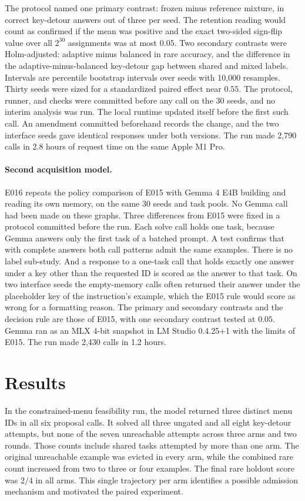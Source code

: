 \documentclass[11pt]{article}
\begin{document}
The protocol named one primary contrast: frozen minus reference
mixture, in correct key-detour answers out of three per seed. The
retention reading would count as confirmed if the mean was positive and
the exact two-sided sign-flip value over all $2^{30}$ assignments was
at most $0.05$. Two secondary contrasts were Holm-adjusted: adaptive
minus balanced in rare accuracy, and the difference in the
adaptive-minus-balanced key-detour gap between shared and mixed labels.
Intervals are percentile bootstrap intervals over seeds with 10,000
resamples. Thirty seeds were sized for a standardized paired effect
near $0.55$.
The protocol, runner, and checks were committed before any call on the
30 seeds, and no interim analysis was run. The local runtime updated
itself before the first such call. An amendment committed beforehand
records the change, and the two interface seeds gave identical
responses under both versions. The run made 2,790 calls in 2.8 hours
of request time on the same Apple M1 Pro.

\paragraph{Second acquisition model.}
E016 repeats the policy comparison of E015 with Gemma 4 E4B building
and reading its own memory, on the same 30 seeds and task pools. No
Gemma call had been made on these graphs. Three differences from E015
were fixed in a protocol committed before the run. Each solve call
holds one task, because Gemma answers only the first task of a batched
prompt. A test confirms that with complete answers both call patterns
admit the same examples. There is no label sub-study. And a response
to a one-task call that holds exactly one answer under a key other than
the requested ID is scored as the answer to that task. On two
interface seeds the empty-memory calls often returned their answer
under the placeholder key of the instruction's example, which the E015
rule would score as wrong for a formatting reason. The primary and
secondary contrasts and the decision rule are those of E015, with one
secondary contrast tested at $0.05$. Gemma ran as an MLX 4-bit
snapshot in LM Studio 0.4.25+1 with the limits of E015. The run made
2,430 calls in 1.2 hours.


\section{Results}

In the constrained-menu feasibility run, the model returned three distinct
menu IDs in all six proposal calls. It solved all three ungated and all
eight key-detour attempts, but none of the seven unreachable attempts
across three arms and two rounds. Those counts include shared tasks
attempted by more than one arm. The original unreachable example was
evicted in every arm, while the combined rare count increased from
two to three or four examples. The final rare holdout score was $2/4$
in all arms. This single trajectory per arm identifies a possible
admission mechanism and motivated the paired experiment.
\end{document}
